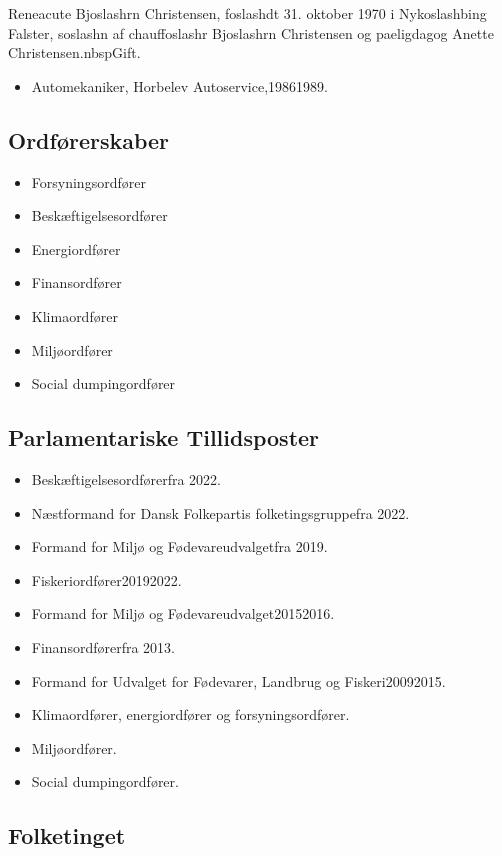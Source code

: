\documentclass[11pt, a4paper]{awesome-cv}
\begin{document}
\makecvheader[R]
\makelettertitle
\begin{cvletter}
Reneacute Bjoslashrn Christensen, foslashdt 31. oktober 1970 i Nykoslashbing Falster, soslashn af chauffoslashr Bjoslashrn Christensen og paeligdagog Anette Christensen.nbspGift.

\begin{itemize}
\item Automekaniker, Horbelev Autoservice,19861989.
\end{itemize}
\subsection*{Ordførerskaber}
\begin{itemize}
\item Forsyningsordfører
\item Beskæftigelsesordfører
\item Energiordfører
\item Finansordfører
\item Klimaordfører
\item Miljøordfører
\item Social dumpingordfører
\end{itemize}
\subsection*{Parlamentariske Tillidsposter}
\begin{itemize}
\item Beskæftigelsesordførerfra 2022.
\item Næstformand for Dansk Folkepartis folketingsgruppefra 2022.
\item Formand for Miljø og Fødevareudvalgetfra 2019.
\item Fiskeriordfører20192022.
\item Formand for Miljø og Fødevareudvalget20152016.
\item Finansordførerfra 2013.
\item Formand for Udvalget for Fødevarer, Landbrug og Fiskeri20092015.
\item Klimaordfører, energiordfører og forsyningsordfører.
\item Miljøordfører.
\item Social dumpingordfører.
\end{itemize}
\subsection*{Folketinget}

\end{cvletter}
\end{document}
